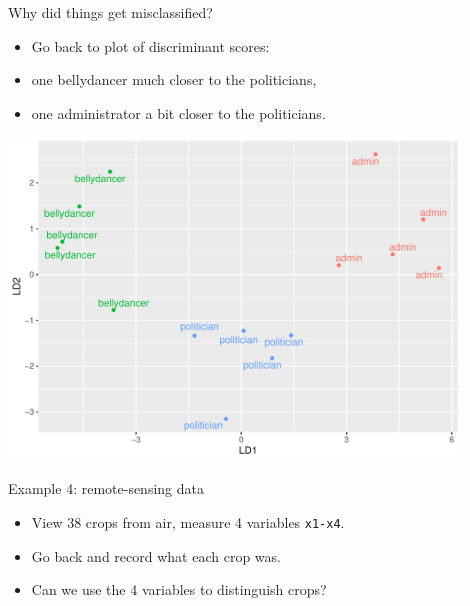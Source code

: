 \documentclass[ignorenonframetext,]{beamer}
\begin{document}
\begin{frame}{Why did things get misclassified?}
\protect\hypertarget{why-did-things-get-misclassified}{}

\begin{minipage}[t]{0.3\linewidth}

\begin{itemize}

\item Go back to plot of discriminant scores:

\item one bellydancer much closer to the politicians,

\item one administrator a bit closer to the politicians.
\end{itemize}
\end{minipage}\hfill
\begin{minipage}[t][][b]{0.68\linewidth}

\includegraphics[width=0.9\textwidth, valign=t]{nesta}
       
\end{minipage}

\end{frame}

\begin{frame}[fragile]{Example 4: remote-sensing data}
\protect\hypertarget{example-4-remote-sensing-data}{}

\begin{itemize}
\item
  View 38 crops from air, measure 4 variables \texttt{x1-x4}.
\item
  Go back and record what each crop was.
\item
  Can we use the 4 variables to distinguish crops?
\end{itemize}

\end{frame}
\end{document}
